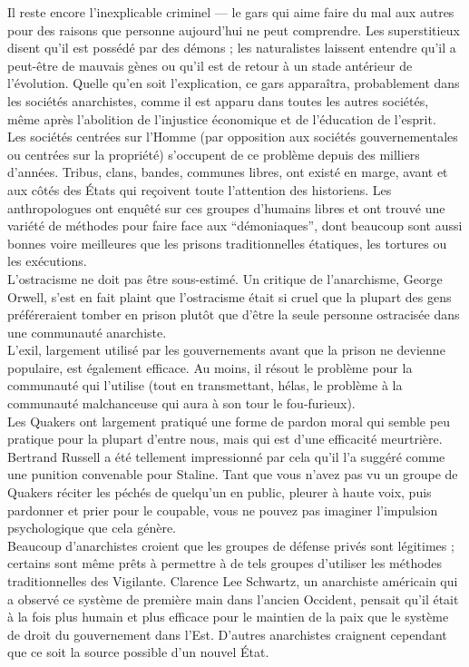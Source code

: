Il reste encore l'inexplicable criminel --- le gars qui aime faire du mal aux autres pour des raisons que personne aujourd'hui ne peut comprendre. Les superstitieux disent qu'il est possédé par des démons ; les naturalistes laissent entendre qu'il a peut-être de mauvais gènes ou qu'il est de retour à un stade antérieur de l'évolution. Quelle qu'en soit l'explication, ce gars apparaîtra, probablement dans les sociétés anarchistes, comme il est apparu dans toutes les autres sociétés, même après l'abolition de l'injustice économique et de l'éducation de l'esprit.\\
Les sociétés centrées sur l'Homme (par opposition aux sociétés gouvernementales ou centrées sur la propriété) s'occupent de ce problème depuis des milliers d'années. Tribus, clans, bandes, communes libres, ont existé en marge, avant et aux côtés des États qui reçoivent toute l'attention des historiens. Les anthropologues ont enquêté sur ces groupes d'humains libres et ont trouvé une variété de méthodes pour faire face aux ``démoniaques'', dont beaucoup sont aussi bonnes voire meilleures que les prisons traditionnelles étatiques, les tortures ou les exécutions.\\
L'ostracisme ne doit pas être sous-estimé. Un critique de l'anarchisme, George Orwell, s'est en fait plaint que l'ostracisme était si cruel que la plupart des gens préféreraient tomber en prison plutôt que d'être la seule personne ostracisée dans une communauté anarchiste.\\
L'exil, largement utilisé par les gouvernements avant que la prison ne devienne populaire, est également efficace. Au moins, il résout le problème pour la communauté qui l'utilise (tout en transmettant, hélas, le problème à la communauté malchanceuse qui aura à son tour le fou-furieux).\\
Les Quakers ont largement pratiqué une forme de pardon moral qui semble peu pratique pour la plupart d'entre nous, mais qui est d'une efficacité meurtrière. Bertrand Russell a été tellement impressionné par cela qu'il l'a suggéré comme une punition convenable pour Staline. Tant que vous n'avez pas vu un groupe de Quakers réciter les péchés de quelqu'un en public, pleurer à haute voix, puis pardonner et prier pour le coupable, vous ne pouvez pas imaginer l'impulsion psychologique que cela génère.\\
Beaucoup d'anarchistes croient que les groupes de défense privés sont légitimes ; certains sont même prêts à permettre à de tels groupes d'utiliser les méthodes traditionnelles des Vigilante. Clarence Lee Schwartz, un anarchiste américain qui a observé ce système de première main dans l'ancien Occident, pensait qu'il était à la fois plus humain et plus efficace pour le maintien de la paix que le système de droit du gouvernement dans l'Est. D'autres anarchistes craignent cependant que ce soit la source possible d'un nouvel État.\\
